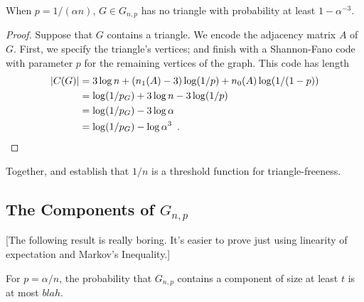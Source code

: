 \documentclass{patmorin}
\begin{document}
\begin{thm}
  When $p = 1/(\alpha n)$, $G \in G_{n, p}$ has no triangle with
  probability at least $1 - \alpha^{-3}$.
\end{thm}
\begin{proof}
  Suppose that $G$ contains a triangle. We encode the adjacency matrix
  $A$ of $G$. First, we specify the triangle's vertices; and finish
  with a Shannon-Fano code with parameter $p$ for the remaining
  vertices of the graph. This code has length
  \begin{align*}
    |C(G)| &= 3 \log n + (n_1(A) - 3) \log (1/p) + n_0(A) \log (1/(1 - p)) \\
    &= \log (1/p_G) + 3 \log n - 3 \log (1/p) \\
    &= \log (1/p_G) - 3 \log \alpha \\
    &= \log (1/p_G) - \log \alpha^3 \enspace . \qedhere
  \end{align*}
\end{proof}

Together,  and  establish
that $1/n$ is a threshold function for triangle-freeness.


\subsection{The Components of $G_{n,p}$}

[The following result is really boring. It's easier to prove just using linearity of expectation and Markov's Inequality.]

\begin{thm}
  For $p=\alpha/n$, the probability that $G_{n,p}$ contains a component of size at least $t$ is at most $blah$.
\end{thm}
\end{document}
